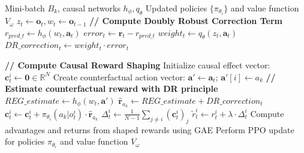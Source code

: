 \documentclass{article}
\begin{document}
\begin{algorithm}
\caption{Update Agent Policies with Doubly Robust Causal Reward Shaping}
\label{alg:agent-update-dr-rkhs}
\begin{algorithmic}[1]
\Require Mini-batch $B_k$, causal networks $h_\phi, q_\theta$
\Ensure Updated policies $\{\pi_{\theta_i}\}$ and value function $V_{\omega}$
    \State $z_t \leftarrow \mathbf{o}_t, w_t \leftarrow \mathbf{o}_{t-1}$
    \State \textbf{// Compute Doubly Robust Correction Term}
    \State $r_{pred\_t} \leftarrow h_\phi(w_t, \mathbf{a}_t)$
    \State $error_t \leftarrow \mathbf{r}_t - r_{pred\_t}$
    \State $weight_t \leftarrow q_\theta(z_t, \mathbf{a}_t)$
    \State $DR\_correction_t \leftarrow weight_t \cdot error_t$
    
    \State \textbf{// Compute Causal Reward Shaping}
        \State Initialize causal effect vector: $\mathbf{c}^i_t \leftarrow \mathbf{0} \in \mathbb{R}^N$
            \State Create counterfactual action vector: $\mathbf{a}' \leftarrow \mathbf{a}_t$; $\mathbf{a}'[i] \leftarrow a_k$
            \State \textbf{// Estimate counterfactual reward with DR principle}
            \State $REG\_estimate \leftarrow h_\phi(w_t, \mathbf{a}')$
            \State $\mathbf{\hat{r}}_{a_k} \leftarrow REG\_estimate + DR\_correction_t$
            \State $\mathbf{c}^i_t \leftarrow \mathbf{c}^i_t + \pi_{\theta_i}(a_k | o^i_t) \cdot \mathbf{\hat{r}}_{a_k}$
        \EndFor
        \State $\Delta^i_t \leftarrow \frac{1}{N-1}\sum_{j \neq i}(\mathbf{c}^{i}_t)_j$
        \State $\tilde{r}^i_t \leftarrow r^i_t + \lambda \cdot \Delta^i_t$
    \EndFor
\EndFor
\State Compute advantages and returns from shaped rewards using GAE
\State Perform PPO update for policies $\pi_{\theta_i}$ and value function $V_\omega$
\end{algorithmic}
\end{algorithm}
\end{document}
